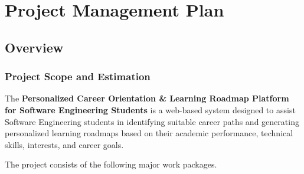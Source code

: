 \chapter{Project Management Plan}

\section{Overview}

\subsection{Project Scope and Estimation}

The \textbf{Personalized Career Orientation \& Learning Roadmap Platform for Software Engineering Students} is a web-based system designed to assist Software Engineering students in identifying suitable career paths and generating personalized learning roadmaps based on their academic performance, technical skills, interests, and career goals.

The project consists of the following major work packages.

